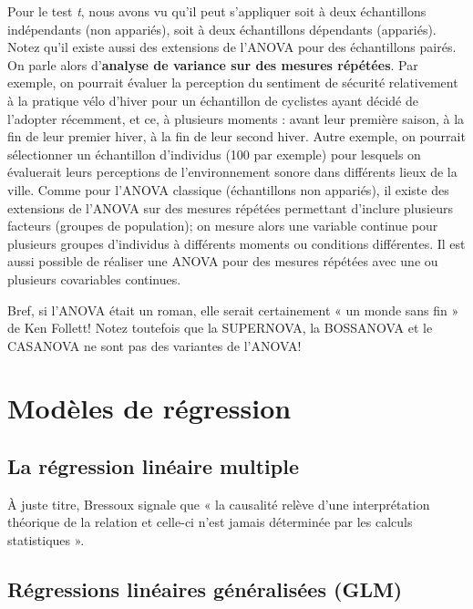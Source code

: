 \documentclass[
  11pt,
  french,
]{book}
\makeatletter
\newenvironment{kframev}{%
\medskip{}
\setlength{\fboxsep}{.8em}
 \def\at@end@of@kframev{}%
 \ifinner\ifhmode%
  \def\at@end@of@kframev{\end{minipage}}%
  \begin{minipage}{\columnwidth}%
 \fi\fi%
 \def\FrameCommand##1{\hskip\@totalleftmargin \hskip-\fboxsep
 \colorbox{shadebluecolor}{##1}\hskip-\fboxsep
     \hskip-\linewidth \hskip-\@totalleftmargin \hskip\columnwidth}%
 \MakeFramed {\advance\hsize-\width
   \@totalleftmargin\z@ \linewidth\hsize
   \@setminipage}}%
 {\par\unskip\endMakeFramed%
 \at@end@of@kframev}
\newenvironment{rmdblock}[1]
  {
  \begin{itemize}
  \renewcommand{\labelitemi}{
    \raisebox{-.7\height}[0pt][0pt]{
      {\setkeys{Gin}{width=3em,keepaspectratio}\texttt{[image: images/\#1]}}
    }
  }
  \setlength{\fboxsep}{1em}
  \begin{kframev}
  \small
  \item
  }
  {
  \end{kframev}
  \end{itemize}
  }
\newenvironment{bloc_aller_loin}
  {\begin{rmdblock}{aller_loin}}
  {\end{rmdblock}}
\makeatother
\begin{document}
\begin{bloc_aller_loin}
Pour le test \emph{t}, nous avons vu qu'il peut s'appliquer soit à deux échantillons indépendants (non appariés), soit à deux échantillons dépendants (appariés). Notez qu'il existe aussi des extensions de l'ANOVA pour des échantillons pairés. On parle alors d'\textbf{analyse de variance sur des mesures répétées}. Par exemple, on pourrait évaluer la perception du sentiment de sécurité relativement à la pratique vélo d'hiver pour un échantillon de cyclistes ayant décidé de l'adopter récemment, et ce, à plusieurs moments : avant leur première saison, à la fin de leur premier hiver, à la fin de leur second hiver. Autre exemple, on pourrait sélectionner un échantillon d'individus (100 par exemple) pour lesquels on évaluerait leurs perceptions de l'environnement sonore dans différents lieux de la ville. Comme pour l'ANOVA classique (échantillons non appariés), il existe des extensions de l'ANOVA sur des mesures répétées permettant d'inclure plusieurs facteurs (groupes de population); on mesure alors une variable continue pour plusieurs groupes d'individus à différents moments ou conditions différentes. Il est aussi possible de réaliser une ANOVA pour des mesures répétées avec une ou plusieurs covariables continues.

Bref, si l'ANOVA était un roman, elle serait certainement « un monde sans fin » de Ken Follett! Notez toutefois que la SUPERNOVA, la BOSSANOVA et le CASANOVA ne sont pas des variantes de l'ANOVA!

\end{bloc_aller_loin}

\hypertarget{part-moduxe8les-de-ruxe9gression}{%
\part{Modèles de régression}\label{part-moduxe8les-de-ruxe9gression}}

\hypertarget{chap05}{%
\chapter{La régression linéaire multiple}\label{chap05}}

À juste titre, Bressoux \citeyearpar[pp 15]{bressoux2010} signale que « la causalité relève d'une interprétation théorique de la relation et celle-ci n'est jamais déterminée par les calculs statistiques ».

\hypertarget{chap06}{%
\chapter{Régressions linéaires généralisées (GLM)}\label{chap06}}
\end{document}

